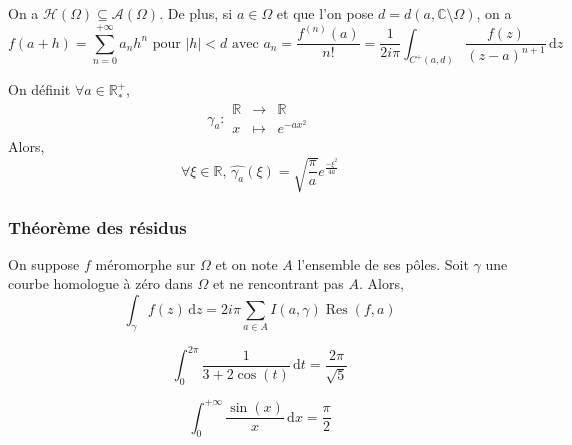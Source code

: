 	
	\begin{corollary}
		On a $\mathcal{H}(\Omega) \subseteq \mathcal{A}(\Omega)$. De plus, si $a \in \Omega$ et que l'on pose $d = d(a, \mathbb{C} \setminus \Omega)$, on a
		\[ f(a + h) = \sum_{n=0}^{+\infty} a_n h^n \text{ pour } \vert h \vert < d \text{ avec } a_n = \frac{f^{(n)}(a)}{n!} = \frac{1}{2i\pi} \int_{C^+(a,d)} \frac{f(z)}{(z-a)^{n+1}} \, \mathrm{d}z \]
	\end{corollary}
	
	
	\begin{application}
		On définit $\forall a \in \mathbb{R}^+_*$,
		\[ \gamma_a :
		\begin{array}{ccc}
			\mathbb{R} &\rightarrow& \mathbb{R} \\
			x &\mapsto& e^{-ax^2}
		\end{array}
		\]
		Alors,
		\[ \forall \xi \in \mathbb{R}, \, \widehat{\gamma_a}(\xi) = \sqrt{\frac{\pi}{a}} e^{\frac{- \xi^2}{4a}} \]
	\end{application}
	
	\subsubsection{Théorème des résidus}
	
	
	\begin{theorem}
		On suppose $f$ méromorphe sur $\Omega$ et on note $A$ l'ensemble de ses pôles. Soit $\gamma$ une courbe homologue à zéro dans $\Omega$ et ne rencontrant pas $A$. Alors,
		\[ \int_\gamma f(z) \, \mathrm{d}z = 2i\pi \sum_{a \in A} I(a, \gamma) \operatorname{Res}(f, a) \]
	\end{theorem}
	
	
	\begin{example}
		\[ \int_{0}^{2\pi} \frac{1}{3 + 2\cos(t)} \, \mathrm{d}t = \frac{2\pi}{\sqrt{5}} \]
	\end{example}
	
	\begin{example}
		\[ \int_{0}^{+\infty} \frac{\sin(x)}{x} \, \mathrm{d}x = \frac{\pi}{2} \]
	\end{example}
	
